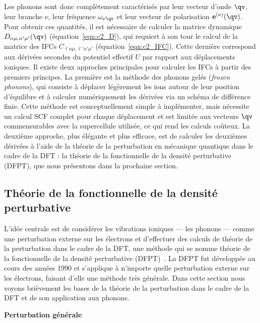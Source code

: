 Les phonons sont donc complètement caractérisés par leur vecteur d'onde $\qv$, leur branche $\nu$, leur fréquence $\omega_{\nu\qv}$ et leur vecteur de polarisation $\mathbf{e}^{(\nu)}(\qv)$. Pour obtenir ces quantités, il est nécessaire de calculer la matrice dynamique $D_{\alpha\mu,\alpha'\mu'}(\qv)$ (équation~\eqref{eqn:c2_D}), qui requiert à son tour le calcul de la matrice des IFCs $C_{\ell\alpha\mu,\ell'\alpha'\mu'}$ (équation~\eqref{eqn:c2_IFC}). Cette dernière correspond aux dérivées secondes du potentiel effectif $U$ par rapport aux déplacements ioniques. Il existe deux approches principales pour calculer les IFCs à partir des premiers principes. La première est la méthode des phonons gelés (\textit{frozen phonons}), qui consiste à déplacer légèrement les ions autour de leur position d'équilibre et à calculer numériquement les dérivées via un schéma de différence finie. Cette méthode est conceptuellement simple à implémenter, mais nécessite un calcul SCF complet pour chaque déplacement et est limitée aux vecteurs $\qv$ commensurables avec la supercellule utilisée, ce qui rend les calculs coûteux. La deuxième approche, plus élégante et plus efficace, est de calculer les deuxièmes dérivées à l'aide de la théorie de la perturbation en mécanique quantique dans le cadre de la DFT : la théorie de la fonctionnelle de la densité perturbative (DFPT), que nous présentons dans la prochaine section.

\subsection{Théorie de la fonctionnelle de la densité perturbative}\label{sec:dfpt}
L'idée centrale est de considérer les vibrations ioniques --- les phonons --- comme une perturbation externe sur les électrons et d'effectuer des calculs de théorie de la perturbation dans le cadre de la DFT, une méthode qui se nomme théorie de la fonctionnelle de la densité perturbative (DFPT)~\cite{baroniPhononsRelatedCrystal2001a,baroniGreensfunctionApproachLinear1987,gonzeDensityfunctionalApproachNonlinearresponse1989,savrasovLinearresponseTheoryLattice1996}. La DFPT fut développée au cours des années 1990 et s'applique à n'importe quelle perturbation externe sur les électrons, faisant d'elle une méthode très générale. Dans cette section nous voyons brièvement les bases de la théorie de la perturbation dans le cadre de la DFT et de son application aux phonons.

\noindent\textbf{Perturbation générale}

